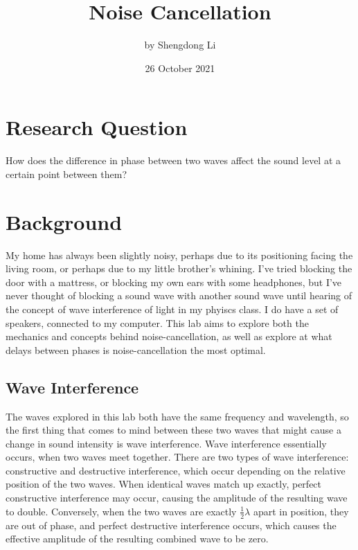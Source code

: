 \documentclass[index]{subfiles}
\begin{document}
\title{Noise Cancellation}
\author{by Shengdong Li}
\date{26 October 2021}
\maketitle

\section{Research Question}

How does the difference in phase between two waves affect the sound level at a certain point between them?

\section{Background}

My home has always been slightly noisy, perhaps due to its positioning facing the living room, or perhaps due to my little brother's whining. I've tried blocking the door with a mattress, or blocking my own ears with some headphones, but I've never thought of blocking a sound wave with another sound wave until hearing of the concept of wave interference of light in my phyiscs class. I do have a set of speakers, connected to my computer. This lab aims to explore both the mechanics and concepts behind noise-cancellation, as well as explore at what delays between phases is noise-cancellation the most optimal.

\subsection{Wave Interference}

The waves explored in this lab both have the same frequency and wavelength, so the first thing that comes to mind between these two waves that might cause a change in sound intensity is wave interference.
Wave interference essentially occurs, when two waves meet together. There are two types of wave interference: constructive and destructive interference, which occur depending on the relative position of the two waves. When identical waves match up exactly, perfect constructive interference may occur, causing the amplitude of the resulting wave to double. Conversely, when the two waves are exactly \(\frac{1}{2}\lambda\) apart in position, they are out of phase, and perfect destructive interference occurs, which causes the effective amplitude of the resulting combined wave to be zero. \cite{openstax}
\end{document}
